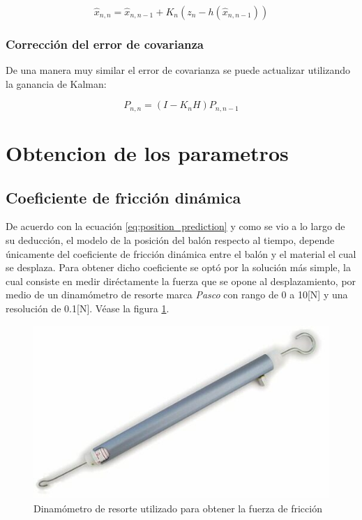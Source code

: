\begin{equation}
\hat{x}_{n,n} = \hat{x}_{n,n-1} + K_n(z_n - h (\hat{x}_{n,n-1}))
\label{eq:prediction_eq}
\end{equation}
	
		\subsubsection*{Corrección del error de covarianza}
	De una manera muy similar el error de covarianza se puede actualizar utilizando la ganancia de Kalman:

\begin{equation}
P_{n,n} = (I - K_n H) P_{n,n-1}
\end{equation}

	\section{Obtencion de los parametros}
		\subsection*{Coeficiente de fricción dinámica}
	De acuerdo con la ecuación \ref{eq:position_prediction} y como se vio a lo largo de su deducción, el modelo de la posición del balón respecto al tiempo, depende únicamente del coeficiente de fricción dinámica entre el balón y el material el cual se desplaza. Para obtener dicho coeficiente se optó por la solución más simple, la cual consiste en medir diréctamente la fuerza que se opone al desplazamiento, por medio de un dinamómetro de resorte marca \textit{Pasco} con rango de 0 a 10[N] y una resolución de 0.1[N]. Véase la figura \ref{fig:dynamometer}. 
	
\begin{figure}
\centering
\includegraphics[scale=0.4]{images/dynamometer.jpg}
\caption{Dinamómetro de resorte utilizado para obtener la fuerza de fricción}
\label{fig:dynamometer}
\end{figure}	

